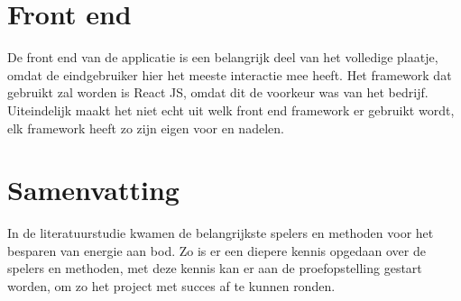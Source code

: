 \section{Front end}
\label{sec:stand-van-zaken-front-end}

De front end van de applicatie is een belangrijk deel van het volledige plaatje, omdat de eindgebruiker hier het meeste interactie mee heeft. Het framework dat gebruikt zal worden is React JS, omdat dit de voorkeur was van het bedrijf.\\

Uiteindelijk maakt het niet echt uit welk front end framework er gebruikt wordt, elk framework heeft zo zijn eigen voor en nadelen.

\section{Samenvatting}
\label{sec:stand-van-zaken-samenvatting}

In de literatuurstudie kwamen de belangrijkste spelers en methoden voor het besparen van energie aan bod. Zo is er een diepere kennis opgedaan over de spelers en methoden, met deze kennis kan er aan de proefopstelling gestart worden, om zo het project met succes af te kunnen ronden.